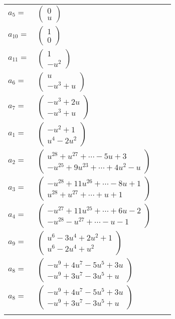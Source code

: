 \documentclass[1p]{elsarticle_modified}
\theoremstyle{definition}
\begin{document}
\begin{tabular}{m{7pt} m{180pt} m{7pt} m{180pt} }
\flushright $a_{5}=$&$\begin{pmatrix}0\\u\end{pmatrix}$ \\
\flushright $a_{10}=$&$\begin{pmatrix}1\\0\end{pmatrix}$ \\
\flushright $a_{11}=$&$\begin{pmatrix}1\\- u^2\end{pmatrix}$ \\
\flushright $a_{6}=$&$\begin{pmatrix}u\\- u^3+u\end{pmatrix}$ \\
\flushright $a_{7}=$&$\begin{pmatrix}- u^3+2 u\\- u^3+u\end{pmatrix}$ \\
\flushright $a_{1}=$&$\begin{pmatrix}- u^2+1\\u^4-2 u^2\end{pmatrix}$ \\
\flushright $a_{2}=$&$\begin{pmatrix}u^{28}+u^{27}+\cdots-5 u+3\\- u^{25}+9 u^{23}+\cdots+4 u^2- u\end{pmatrix}$ \\
\flushright $a_{3}=$&$\begin{pmatrix}- u^{28}+11 u^{26}+\cdots-8 u+1\\u^{28}+u^{27}+\cdots+u+1\end{pmatrix}$ \\
\flushright $a_{4}=$&$\begin{pmatrix}- u^{27}+11 u^{25}+\cdots+6 u-2\\- u^{28}- u^{27}+\cdots- u-1\end{pmatrix}$ \\
\flushright $a_{9}=$&$\begin{pmatrix}u^6-3 u^4+2 u^2+1\\u^6-2 u^4+u^2\end{pmatrix}$ \\
\flushright $a_{8}=$&$\begin{pmatrix}- u^9+4 u^7-5 u^5+3 u\\- u^9+3 u^7-3 u^5+u\end{pmatrix}$\\ \flushright $a_{8}=$&$\begin{pmatrix}- u^9+4 u^7-5 u^5+3 u\\- u^9+3 u^7-3 u^5+u\end{pmatrix}$\\&\end{tabular}
\end{document}
